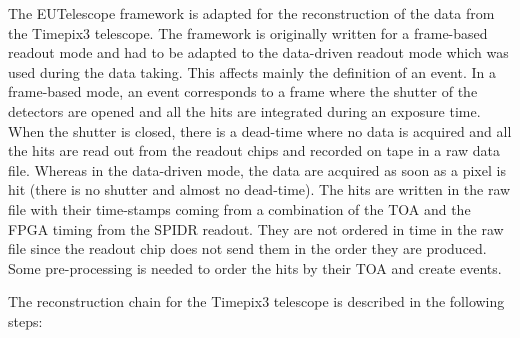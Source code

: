 The EUTelescope framework is adapted for the reconstruction of the
data from the Timepix3 telescope. The framework is originally written
for a frame-based readout mode and had to be adapted to the
data-driven readout mode which was used during the data taking. This
affects mainly the definition of an event. In a frame-based mode, an
event corresponds to a frame where the shutter of the detectors are
opened and all the hits are integrated during an exposure time. When
the shutter is closed, there is a dead-time where no data is acquired
and all the hits are read out from the readout chips and recorded on
tape in a raw data file. Whereas in the data-driven mode, the data are
acquired as soon as a pixel is hit (there is no shutter and almost no
dead-time). The hits are written in the raw file with their
time-stamps coming from a combination of the TOA and the FPGA timing
from the SPIDR readout. They are not ordered in time in the raw file
since the readout chip does not send them in the order they are
produced. Some pre-processing is needed to order the hits by their TOA
and create events.

The reconstruction chain for the Timepix3 telescope is described in
the following steps:

